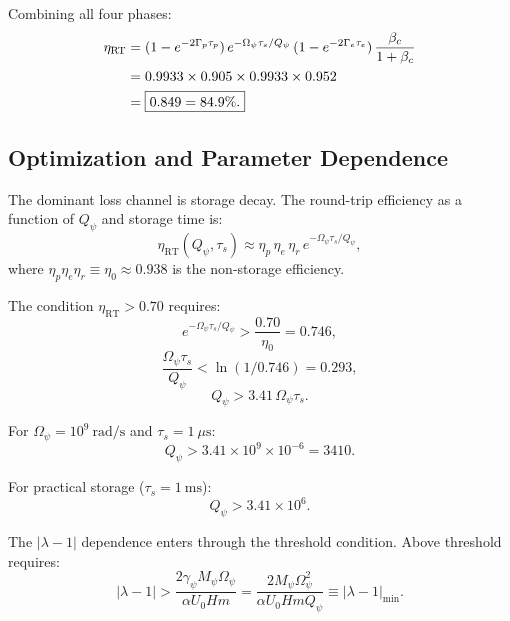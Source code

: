\documentclass[aps,prd,twocolumn,showpacs,preprintnumbers,superscriptaddress,nofootinbib]{revtex4-2}
\newcommand{\Qpsi}{Q_\psi}
\newcommand{\Mpsi}{M_\psi}
\newcommand{\Opsi}{\Omega_\psi}
\begin{document}
Combining all four phases:
\begin{align}\label{eq:eta-RT-full}
\eta_{\mathrm{RT}} &= (1 - e^{-2\Gamma_p\tau_p})\,
  e^{-\Opsi\tau_s/\Qpsi}\,
  (1 - e^{-2\Gamma_e\tau_e})\,
  \frac{\beta_c}{1+\beta_c} \notag\\
  &= 0.9933\times 0.905\times 0.9933\times 0.952 \notag\\
  &= \boxed{0.849 = 84.9\%.}
\end{align}

\subsection{Optimization and Parameter Dependence}\label{sec:optimize}

The dominant loss channel is storage decay.  The round-trip efficiency
as a function of $\Qpsi$ and storage time is:
\begin{equation}\label{eq:eta-vs-Q}
\eta_{\mathrm{RT}}(\Qpsi, \tau_s) \approx
  \eta_p\,\eta_e\,\eta_r\,e^{-\Opsi\tau_s/\Qpsi},
\end{equation}
where $\eta_p\eta_e\eta_r \equiv \eta_0 \approx 0.938$ is the
non-storage efficiency.

The condition $\eta_{\mathrm{RT}} > 0.70$ requires:
\begin{equation}
e^{-\Opsi\tau_s/\Qpsi} > \frac{0.70}{\eta_0} = 0.746,
\end{equation}
\begin{equation}
\frac{\Opsi\tau_s}{\Qpsi} < \ln(1/0.746) = 0.293,
\end{equation}
\begin{equation}\label{eq:Q-bound}
\boxed{\Qpsi > 3.41\,\Opsi\tau_s.}
\end{equation}

For $\Opsi = 10^9~\mathrm{rad/s}$ and $\tau_s = 1~\mu\mathrm{s}$:
\begin{equation}
\Qpsi > 3.41\times 10^9\times 10^{-6} = 3410.
\end{equation}

For practical storage ($\tau_s = 1~\mathrm{ms}$):
\begin{equation}
\Qpsi > 3.41\times 10^6.
\end{equation}

The $|\lambda-1|$ dependence enters through the threshold condition.
Above threshold requires:
\begin{equation}
|\lambda-1| > \frac{2\gamma_\psi\Mpsi\Opsi}{\alpha U_0 Hm}
  = \frac{2\Mpsi\Opsi^2}{\alpha U_0 Hm\Qpsi} \equiv |\lambda-1|_{\min}.
\end{equation}
\end{document}
